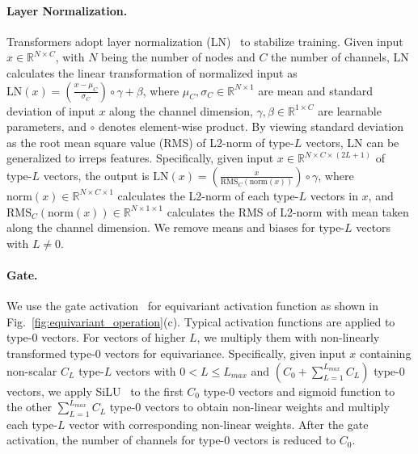 \vspace{-2.5mm}
\paragraph{Layer Normalization.}
Transformers adopt layer normalization (LN)~\citep{layer_norm} to stabilize training.
Given input $x \in \mathbb{R}^{N \times C}$, with $N$ being the number of nodes and $C$ the number of channels, LN  calculates the linear transformation of normalized input as $\text{LN}(x) = \left( \frac{  x - \mu_{C}  }{\sigma_{C}} \right) \circ \gamma + \beta$,
where $\mu_{C}, \sigma_{C} \in \mathbb{R}^{N \times 1}$ are mean and standard deviation of input $x$ along the channel dimension, $\gamma, \beta \in \mathbb{R}^{1 \times C}$ are learnable parameters, and $\circ$ denotes element-wise product.
By viewing standard deviation as the root mean square value (RMS) of L2-norm of type-$L$ vectors, LN can be generalized to irreps features.
Specifically, given input $x \in \mathbb{R}^{N \times C \times (2L + 1)}$ of type-$L$ vectors, the output is
$\text{LN}(x) = \left( \frac{x}{\text{RMS}_{C}(\text{norm}(x))} \right) \circ \gamma$,
where $\text{norm}(x) \in \mathbb{R}^{N \times C \times 1}$ calculates the L2-norm of each type-$L$ vectors in $x$, and $\text{RMS}_{C}(\text{norm}(x)) \in \mathbb{R}^{N \times 1 \times 1}$ calculates the RMS of L2-norm with mean taken along the channel dimension.
We remove means and biases for type-$L$ vectors with $L \neq 0$.

\vspace{-2.5mm}
\paragraph{Gate.}
We use the gate activation~\citep{3dsteerable} for equivariant activation function as shown in Fig.~\ref{fig:equivariant_operation}(c).
Typical activation functions are applied to type-$0$ vectors.
For vectors of higher $L$, we multiply them with non-linearly transformed type-$0$ vectors for equivariance.
Specifically, given input $x$ containing non-scalar $C_{L}$ type-$L$ vectors with $ 0 < L \leq L_{max}$ and $(C_0 + \sum_{L=1}^{L_{max}} C_L)$ type-$0$ vectors, we apply SiLU~\citep{silu, swish} to the first $C_0$ type-$0$ vectors and sigmoid function to the other $\sum_{L=1}^{L_{max}} C_L$ type-$0$ vectors to obtain non-linear weights and multiply each type-$L$ vector with corresponding non-linear weights.
After the gate activation, the number of channels for type-$0$ vectors is reduced to $C_0$.

